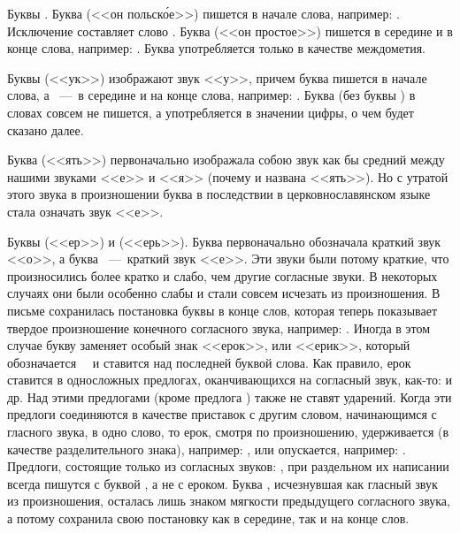 \documentclass[11pt,a4paper,oneside]{memoir}
\begin{document}
    Буквы {}. Буква {} (<<он польск\'ое>>) пишется в начале слова, например: {}. Исключение составляет слово {}. Буква {} (<<он простое>>) пишется в середине и в конце слова, например: {}. Буква {} употребляется только в качестве междометия.
    
    Буквы {} (<<ук>>) изображают звук <<у>>, причем буква {} пишется в начале слова, а {}~---~в середине и на конце слова, например: {}. Буква {} (без буквы {}) в словах совсем не пишется, а употребляется в значении цифры, о чем будет сказано далее.
    
    Буква {} (<<ять>>) первоначально изображала собою звук как бы средний между нашими звуками <<е>> и <<я>> (почему и названа <<ять>>). Но с утратой этого звука в произношении буква {} в последствии в церковнославянском языке стала означать звук <<е>>.
    
    Буквы {} (<<ер>>) и {} (<<ерь>>). Буква {} первоначально обозначала краткий звук <<о>>, а буква {}~---~краткий звук <<е>>. Эти звуки были потому краткие, что произносились более кратко и слабо, чем другие согласные звуки. В некоторых случаях они были особенно слабы и стали совсем исчезать из произношения. В письме сохранилась постановка буквы {} в конце слов, которая теперь показывает твердое произношение конечного согласного звука, например: {}. Иногда в этом случае букву {} заменяет особый знак <<ерок>>, или <<ерик>>, который обозначается~~{} и ставится над последней буквой слова. Как правило, ерок ставится в односложных предлогах, оканчивающихся на согласный звук, как-то: {} и др. Над этими предлогами (кроме предлога {}) также не ставят ударений. Когда эти предлоги соединяются в качестве приставок с другим словом, начинающимся с гласного звука, в одно слово, то ерок, смотря по произношению, удерживается (в качестве разделительного знака), например: {}, или опускается, например: {}. Предлоги, состоящие только из согласных звуков: {}, при раздельном их написании всегда пишутся с буквой {}, а не с ероком. Буква {}, исчезнувшая как гласный звук из произношения, осталась лишь знаком мягкости предыдущего согласного звука, а потому сохранила свою постановку как в середине, так и на конце слов.
\end{document}
